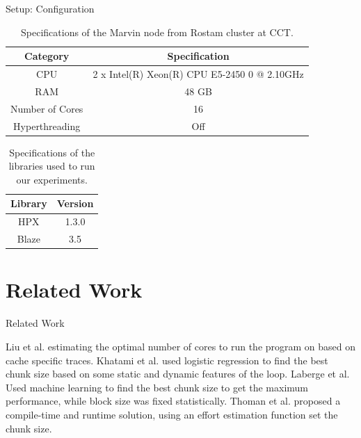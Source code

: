 \documentclass[10pt]{beamer}
\begin{document}
\begin{frame}{Setup: Configuration}
	\begin{outline}
	\vspace{\baselineskip}	
	\begin{table}[H]
		\centering
		\scalebox{0.75}
		{\begin{tabular}{|c | c |} 
				\hline
				
				Category & Specification\\
				\hline
				\hline
				CPU &  2 x Intel(R) Xeon(R) CPU E5-2450 0 @ 2.10GHz \\ [0.5ex] 
				\hline
				RAM & 48 GB\\ 	
				\hline
				Number of Cores & 16\\
				\hline	
				Hyperthreading & Off \\
				\hline			
		\end{tabular}}	
		\caption{Specifications of the Marvin node from Rostam cluster at CCT.}
		\label{table3}
	\end{table} 
\begin{table}[H]
	\centering
	\scalebox{0.75}
	{\begin{tabular}{|c | c |} 
			\hline
			Library & Version \\
			\hline
			\hline
			HPX & 1.3.0 \\ 
			\hline
			Blaze & 3.5\\ 	
			\hline
			
	\end{tabular}}	
	\caption{Specifications of the libraries used to run our experiments.}
	\label{table5}
\end{table}
	\end{outline}
\end{frame}

\section{Related Work}
	\begin{frame}{Related Work}
		\begin{outline}
			\1Liu et al. estimating the optimal number of cores to run the program on based on cache specific traces. 
			\1Khatami et al. used logistic regression to find the best chunk size based on some static and dynamic features of the loop.
			\1Laberge et al. Used machine learning to find the best chunk size to get the maximum performance, while block size was fixed statistically.
			\1Thoman et al. proposed a compile-time and runtime solution, using an effort estimation function set the chunk size. 
		\end{outline}
\end{frame}
\end{document}
